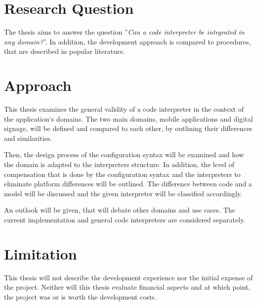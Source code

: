 \documentclass{article}
\begin{document}
%
%

\section*{Research Question}

The thesis aims to answer the question ''\textit{Can a code interpreter be integrated in any domain?}''.
In addition, the development approach is compared to procedures, that are described in popular literature.

\section*{Approach}

This thesis examines the general validity of a code interpreter in the context of the application`s domains.
The two main domains, mobile applications and digital signage, will be defined and compared to each other, by outlining their differences and similarities.

Then, the design process of the configuration syntax will be examined and how the domain is adapted to the interpreters structure.
In addition, the level of compensation that is done by the configuration syntax and the interpreters to eliminate platform differences will be outlined.
The difference between code and a model will be discussed and the given interpreter will be classified accordingly.

An outlook will be given, that will debate other domains and use cases.
The current implementation and general code interpreters are considered separately.


\section*{Limitation}

This thesis will not describe the development experience nor the initial expense of the project.
Neither will this thesis evaluate financial aspects and at which point, the project was or is worth the development costs.
\end{document}
